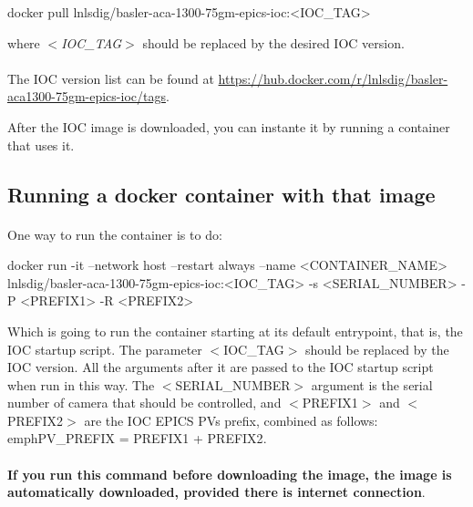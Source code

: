 \documentclass[openany]{article}
\begin{document}
        \vspace{1mm}
        \begin{code}
docker pull lnlsdig/basler-aca-1300-75gm-epics-ioc:<IOC_TAG>
        \end{code}
        \vspace{1mm}

        where \emph{$<$IOC\_TAG$>$} should be replaced by the desired IOC version.

        \paragraph{} The IOC version list can be found at \url{https://hub.docker.com/r/lnlsdig/basler-aca1300-75gm-epics-ioc/tags}.

        After the IOC image is downloaded, you can instante it by running a container that uses it.

    \subsection{Running a docker container with that image}

        \paragraph{} One way to run the container is to do:

        \vspace{1mm}
        \begin{code}
docker run -it --network host --restart always --name <CONTAINER_NAME> lnlsdig/basler-aca-1300-75gm-epics-ioc:<IOC_TAG> -s <SERIAL_NUMBER> -P <PREFIX1> -R <PREFIX2>
        \end{code}
        \vspace{1mm}

        Which is going to run the container starting at its default entrypoint, that is, the IOC startup script. The parameter $<$IOC\_TAG$>$ should be replaced by the IOC version. All the arguments after it are passed to the IOC startup script when run in this way. The $<$SERIAL\_NUMBER$>$ argument is the serial number of camera that should be controlled, and $<$PREFIX1$>$ and $<$PREFIX2$>$ are the IOC EPICS PVs prefix, combined as follows: emph{PV\_PREFIX = PREFIX1 + PREFIX2}.

        \paragraph{} \textbf{If you run this command before downloading the image, the image is automatically downloaded, provided there is internet connection}.
\end{document}
